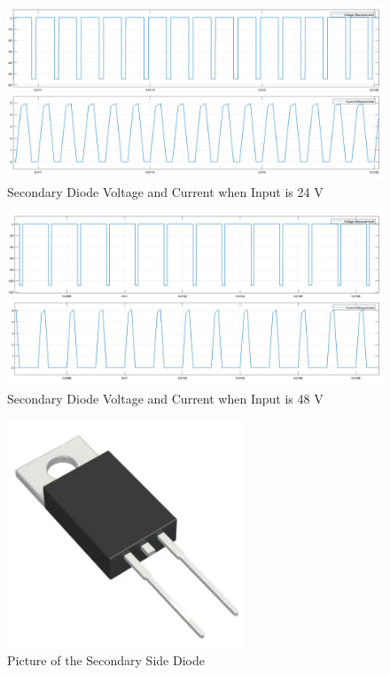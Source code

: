 \documentclass{article}
\begin{document}
\begin{figure}[H]
    \centering
    \includegraphics[scale=0.2]{24v_secondary diode.png} 
    \caption{Secondary Diode Voltage and Current when Input is 24 V}
    \label{fig:my_label}
\end{figure}

\begin{figure}[H]
    \centering
    \includegraphics[scale=0.2]{48v_secondary diode.png}
    \caption{Secondary Diode Voltage and Current when Input is 48 V}
    \label{fig:my_label}
\end{figure}

\begin{figure}[H]
    \centering
    \includegraphics[scale=0.3]{schottky.PNG}
    \caption{Picture of the Secondary Side Diode}
    \label{fig:my_label}
\end{figure}
\end{document}

